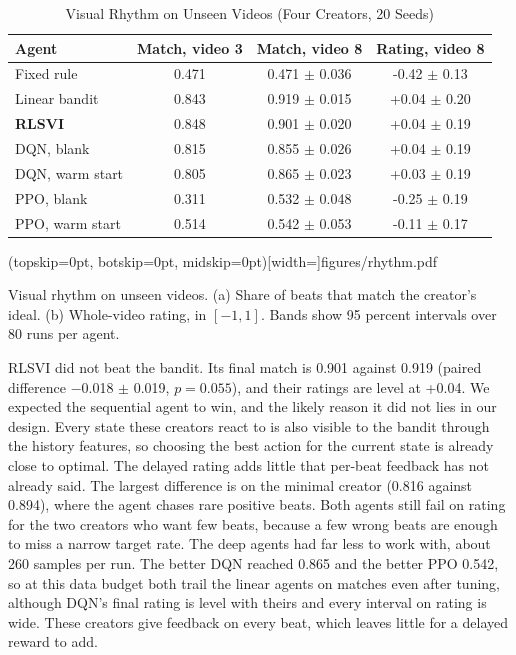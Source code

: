 \documentclass{ieeeaccess}
\begin{document}
\begin{table}[t]
\caption{Visual Rhythm on Unseen Videos (Four Creators, 20 Seeds)}
\label{tab:rhythm}
\setlength{\tabcolsep}{3pt}
\centering
\begin{tabular}{|l|c|c|c|}
\hline
Agent & Match, video 3 & Match, video 8 & Rating, video 8 \\
\hline
Fixed rule & 0.471 & 0.471 $\pm$ 0.036 & -0.42 $\pm$ 0.13 \\
Linear bandit & 0.843 & 0.919 $\pm$ 0.015 & +0.04 $\pm$ 0.20 \\
\textbf{RLSVI} & 0.848 & 0.901 $\pm$ 0.020 & +0.04 $\pm$ 0.19 \\
DQN, blank & 0.815 & 0.855 $\pm$ 0.026 & +0.04 $\pm$ 0.19 \\
DQN, warm start & 0.805 & 0.865 $\pm$ 0.023 & +0.03 $\pm$ 0.19 \\
PPO, blank & 0.311 & 0.532 $\pm$ 0.048 & -0.25 $\pm$ 0.19 \\
PPO, warm start & 0.514 & 0.542 $\pm$ 0.053 & -0.11 $\pm$ 0.17 \\
\hline
\end{tabular}
\end{table}

\Figure[t!](topskip=0pt, botskip=0pt, midskip=0pt)[width=\textwidth]{figures/rhythm.pdf}
{\parbox[t]{0.91\textwidth}{\raggedright Visual rhythm on unseen videos. (a) Share of beats that match the creator's ideal. (b) Whole-video rating, in $[-1,1]$. Bands show 95 percent intervals over 80 runs per agent.}\label{fig:rhythm}}

RLSVI did not beat the bandit. Its final match is 0.901 against 0.919 (paired difference $-$0.018 $\pm$ 0.019, $p=0.055$), and their ratings are level at +0.04. We expected the sequential agent to win, and the likely reason it did not lies in our design. Every state these creators react to is also visible to the bandit through the history features, so choosing the best action for the current state is already close to optimal. The delayed rating adds little that per-beat feedback has not already said. The largest difference is on the minimal creator (0.816 against 0.894), where the agent chases rare positive beats. Both agents still fail on rating for the two creators who want few beats, because a few wrong beats are enough to miss a narrow target rate. The deep agents had far less to work with, about 260 samples per run. The better DQN reached 0.865 and the better PPO 0.542, so at this data budget both trail the linear agents on matches even after tuning, although DQN's final rating is level with theirs and every interval on rating is wide. These creators give feedback on every beat, which leaves little for a delayed reward to add.
\end{document}
